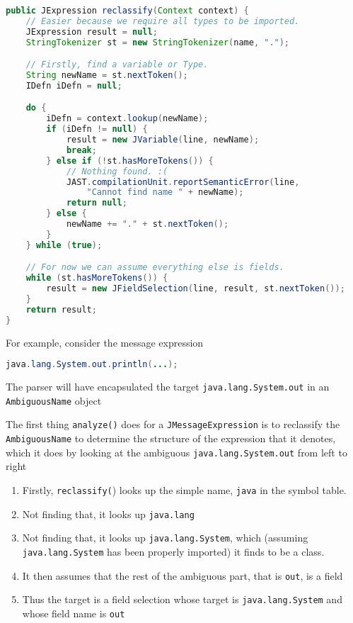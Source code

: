 \documentclass[8pt,a4paper,compress]{beamer}
\begin{document}
\begin{frame}[fragile]
\pause

\begin{lstlisting}[language=Java,style=focusin]
public JExpression reclassify(Context context) {
    // Easier because we require all types to be imported.
    JExpression result = null;
    StringTokenizer st = new StringTokenizer(name, ".");

    // Firstly, find a variable or Type.
    String newName = st.nextToken();
    IDefn iDefn = null;

    do {
        iDefn = context.lookup(newName);
        if (iDefn != null) {
            result = new JVariable(line, newName);
            break;
        } else if (!st.hasMoreTokens()) {
            // Nothing found. :(
            JAST.compilationUnit.reportSemanticError(line,
                "Cannot find name " + newName);
            return null;
        } else {
            newName += "." + st.nextToken();
        }
    } while (true);

    // For now we can assume everything else is fields.
    while (st.hasMoreTokens()) {
        result = new JFieldSelection(line, result, st.nextToken());
    }
    return result;
}
\end{lstlisting}
\end{frame}

\begin{frame}[fragile]
\pause

For example, consider the message expression
\begin{lstlisting}[language=Java,style=focusin]
java.lang.System.out.println(...);
\end{lstlisting}

The parser will have encapsulated the target \lstinline{java.lang.System.out} in an \lstinline{AmbiguousName} object

\pause
\bigskip

The first thing \lstinline{analyze()} does for a \lstinline{JMessageExpression} is to reclassify the \lstinline{AmbiguousName} to determine the structure of the expression that it denotes, which it does by looking at the ambiguous \lstinline{java.lang.System.out} from left to right
\begin{enumerate}
\pause
\item Firstly, \lstinline{reclassify(}) looks up the simple name, \lstinline{java} in the symbol table.
\pause
\item Not finding that, it looks up \lstinline{java.lang}
\pause
\item Not finding that, it looks up \lstinline{java.lang.System}, which (assuming \lstinline{java.lang.System} has been properly imported) it finds to be a class.
\pause
\item It then assumes that the rest of the ambiguous part, that is \lstinline{out}, is a field
\pause
\item Thus the target is a field selection whose target is \lstinline{java.lang.System} and whose field name is \lstinline{out}
\end{enumerate}
\end{frame}
\end{document}

